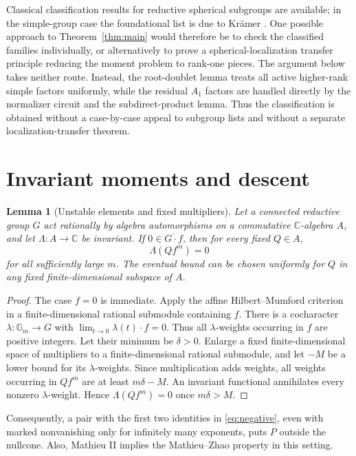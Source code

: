 \documentclass[11pt]{article}
\numberwithin{equation}{section}
\newtheorem{lemma}[theorem]{Lemma}
\theoremstyle{definition}
\theoremstyle{remark}
\newcommand{\C}{\mathbb C}
\newcommand{\Gm}{\mathbb G_m}
\begin{document}
Classical classification results for reductive spherical subgroups are available; in the simple-group case the foundational list is due to Kr\"amer \cite{Kramer}. One possible approach to Theorem~\ref{thm:main} would therefore be to check the classified families individually, or alternatively to prove a spherical-localization transfer principle reducing the moment problem to rank-one pieces. The argument below takes neither route. Instead, the root-doublet lemma treats all active higher-rank simple factors uniformly, while the residual $A_1$ factors are handled directly by the normalizer circuit and the subdirect-product lemma. Thus the classification is obtained without a case-by-case appeal to subgroup lists and without a separate localization-transfer theorem.

\section{Invariant moments and descent}
\begin{lemma}[Unstable elements and fixed multipliers]\label{lem:unstable}
Let a connected reductive group $G$ act rationally by algebra automorphisms on a commutative $\C$-algebra $A$, and let $\Lambda:A\to\C$ be invariant. If $0\in\overline{G\cdot f}$, then for every fixed $Q\in A$,
\[
 \Lambda(Qf^m)=0
\]
for all sufficiently large $m$. The eventual bound can be chosen uniformly for $Q$ in any fixed finite-dimensional subspace of $A$.
\end{lemma}
\begin{proof}
The case $f=0$ is immediate. Apply the affine Hilbert--Mumford criterion \cite{Kempf} in a finite-dimensional rational submodule containing $f$. There is a cocharacter $\lambda:\Gm\to G$ with $\lim_{t\to0}\lambda(t)\cdot f=0$. Thus all $\lambda$-weights occurring in $f$ are positive integers. Let their minimum be $\delta>0$. Enlarge a fixed finite-dimensional space of multipliers to a finite-dimensional rational submodule, and let $-M$ be a lower bound for its $\lambda$-weights. Since multiplication adds weights, all weights occurring in $Qf^m$ are at least $m\delta-M$. An invariant functional annihilates every nonzero $\lambda$-weight. Hence $\Lambda(Qf^m)=0$ once $m\delta>M$.
\end{proof}

Consequently, a pair with the first two identities in \eqref{eq:negative}, even with marked nonvanishing only for infinitely many exponents, puts $P$ outside the nullcone. Also, Mathieu II implies the Mathieu--Zhao property in this setting.
\end{document}
